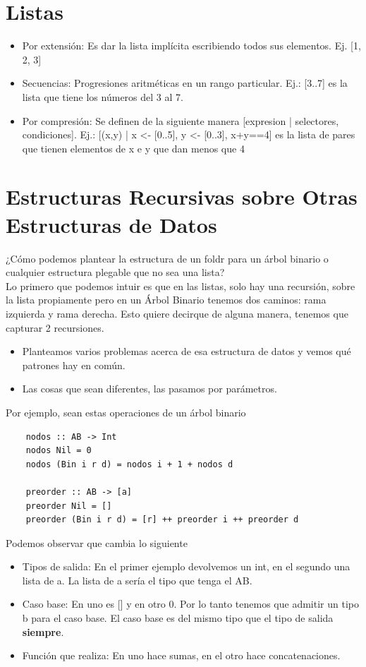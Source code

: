 \documentclass[10pt,a4paper]{article}
\begin{document}
\section*{Listas}
\begin{itemize}
    \item Por extensión: Es dar la lista implícita escribiendo todos sus elementos. Ej. [1, 2, 3]
    \item Secuencias: Progresiones aritméticas en un rango particular. Ej.: [3..7] es la lista que tiene los números del 3 al 7.
    \item Por compresión: Se definen de la siguiente manera [expresion | selectores, condiciones]. Ej.: [(x,y) | x <- [0..5], y <- [0..3], x+y==4] es la lista de pares que tienen elementos de x e y que dan menos que 4
\end{itemize}
\section*{Estructuras Recursivas sobre Otras Estructuras de Datos}
¿Cómo podemos plantear la estructura de un foldr para un árbol binario o cualquier estructura plegable que no sea una lista? \\
Lo primero que podemos intuir es que en las listas, solo hay una recursión, sobre la lista propiamente pero en un Árbol Binario tenemos dos caminos: rama izquierda y rama derecha. Esto quiere decirque de alguna manera, tenemos que capturar 2 recursiones.
\begin{itemize}
    \item Planteamos varios problemas acerca de esa estructura de datos y vemos qué patrones hay en común. 
    \item Las cosas que sean diferentes, las pasamos por parámetros. 
\end{itemize}
Por ejemplo, sean estas operaciones de un árbol binario 
\begin{lstlisting}
    nodos :: AB -> Int 
    nodos Nil = 0
    nodos (Bin i r d) = nodos i + 1 + nodos d 

    preorder :: AB -> [a]
    preorder Nil = []
    preorder (Bin i r d) = [r] ++ preorder i ++ preorder d
\end{lstlisting}
Podemos observar que cambia lo siguiente 
\begin{itemize}
    \item Tipos de salida: En el primer ejemplo devolvemos un int, en el segundo una lista de a. La lista de a sería el tipo que tenga el AB. 
    \item Caso base: En uno es [] y en otro 0. Por lo tanto tenemos que admitir un tipo b para el caso base. El caso base es del mismo tipo que el tipo de salida \textbf{siempre}.
    \item Función que realiza: En uno hace sumas, en el otro hace concatenaciones. 
\end{itemize}
\end{document}
